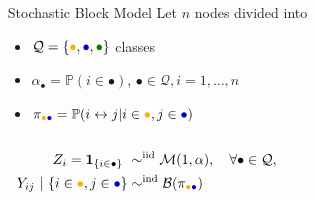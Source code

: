 \documentclass{beamer}\usepackage[]{graphicx}\usepackage[]{color}
\begin{document}
\begin{frame}
\begin{center}
\begin{overlayarea}{\textwidth}{.5\textheight}
\begin{columns}
\begin{column}{.45\paperwidth}
        \end{column}
        \begin{column}{.5\paperwidth}
          \begin{small}
            \begin{block}{Stochastic Block Model}
              Let $n$ nodes divided into
              \begin{itemize}
              \item
                $\mathcal{Q}=\{\textcolor{yellow!40!orange}{\bullet},\textcolor{blue!80!black}{\bullet},\textcolor{green!50!black}{\bullet}\}$
                classes
              \item  $\alpha_\bullet  =  \mathbb{P}(i  \in  \bullet)$,
                $\bullet\in\mathcal{Q},i=1,\dots,n$
              \item      $\pi_{\textcolor{yellow!40!orange}{\bullet}\textcolor{blue!80!black}{\bullet}}     =      \mathbb{P}(i
                \leftrightarrow j | i\in\textcolor{yellow!40!orange}{\bullet},j\in\textcolor{blue!80!black}{\bullet})$
              \end{itemize}
            \end{block}
          \end{small}
        \end{column}
      \end{columns}
    \end{overlayarea}
  \end{center}

  \begin{align*}
    Z_i = \mathbf{1}_{\{i \in \bullet\}}  \ & \sim^{\text{iid}} \mathcal{M}(1,\alpha), \quad \forall\bullet\in\mathcal{Q}, \\
    Y_{ij} \ | \ \{i\in\textcolor{yellow!40!orange}{\bullet},j\in\textcolor{blue!80!black}{\bullet}\} & \sim^{\text{ind}} \mathcal{B}(\pi_{\textcolor{yellow!40!orange}{\bullet}\textcolor{blue!80!black}{\bullet}})\\
  \end{align*}

\end{frame}
\end{document}
